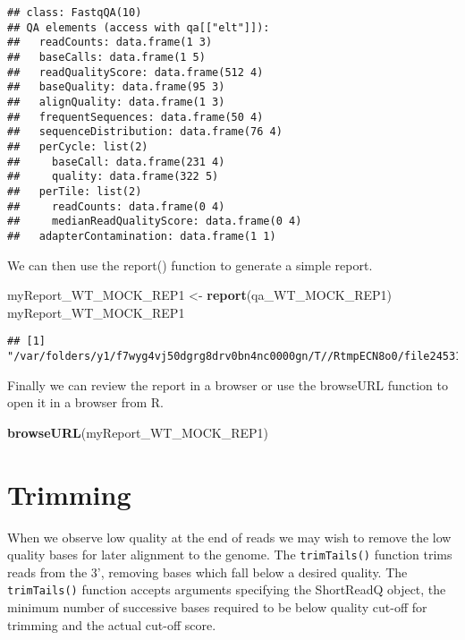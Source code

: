 \documentclass[
]{book}
\newenvironment{Shaded}{\begin{snugshade}}{\end{snugshade}}
\newcommand{\FunctionTok}[1]{\textcolor[rgb]{0.13,0.29,0.53}{\textbf{#1}}}
\newcommand{\NormalTok}[1]{#1}
\newcommand{\OtherTok}[1]{\textcolor[rgb]{0.56,0.35,0.01}{#1}}
\begin{document}
\begin{verbatim}
## class: FastqQA(10)
## QA elements (access with qa[["elt"]]):
##   readCounts: data.frame(1 3)
##   baseCalls: data.frame(1 5)
##   readQualityScore: data.frame(512 4)
##   baseQuality: data.frame(95 3)
##   alignQuality: data.frame(1 3)
##   frequentSequences: data.frame(50 4)
##   sequenceDistribution: data.frame(76 4)
##   perCycle: list(2)
##     baseCall: data.frame(231 4)
##     quality: data.frame(322 5)
##   perTile: list(2)
##     readCounts: data.frame(0 4)
##     medianReadQualityScore: data.frame(0 4)
##   adapterContamination: data.frame(1 1)
\end{verbatim}

We can then use the report() function to generate a simple report.

\begin{Shaded}
\begin{Highlighting}[]
\NormalTok{myReport\_WT\_MOCK\_REP1 }\OtherTok{\textless{}{-}} \FunctionTok{report}\NormalTok{(qa\_WT\_MOCK\_REP1)}
\NormalTok{myReport\_WT\_MOCK\_REP1}
\end{Highlighting}
\end{Shaded}

\begin{verbatim}
## [1] "/var/folders/y1/f7wyg4vj50dgrg8drv0bn4nc0000gn/T//RtmpECN8o0/file245314480129/index.html"
\end{verbatim}

Finally we can review the report in a browser or use the browseURL function to open it in a browser from R.

\begin{Shaded}
\begin{Highlighting}[]
\FunctionTok{browseURL}\NormalTok{(myReport\_WT\_MOCK\_REP1)}
\end{Highlighting}
\end{Shaded}

\hypertarget{trimming}{%
\section{Trimming}\label{trimming}}

When we observe low quality at the end of reads we may wish to remove the low quality bases for later alignment to the genome. The \texttt{trimTails()} function trims reads from the 3', removing bases which fall below a desired quality. The \texttt{trimTails()} function accepts arguments specifying the ShortReadQ object, the minimum number of successive bases required to be below quality cut-off for trimming and the actual cut-off score.
\end{document}
